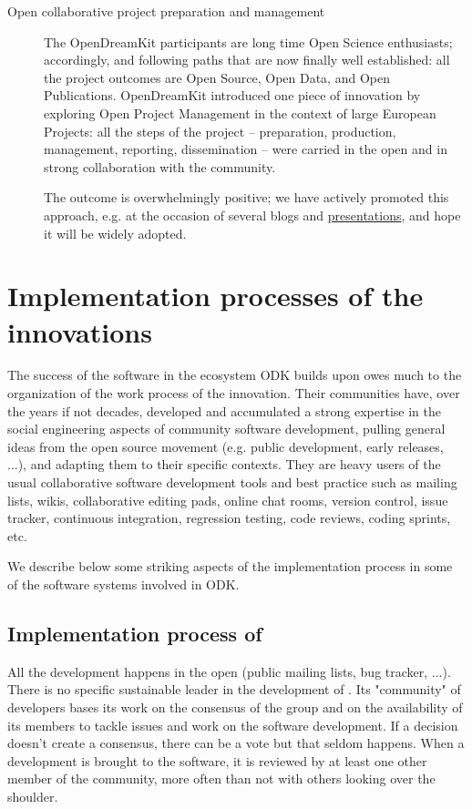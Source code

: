 \documentclass{deliverablereport}
\begin{document}
\begin{description}
\item[Open collaborative project preparation and management] The
  OpenDreamKit participants are long time Open Science enthusiasts;
  accordingly, and following paths that are now finally well
  established: all the project outcomes are Open Source, Open Data,
  and Open Publications. OpenDreamKit introduced one piece of
  innovation by exploring Open Project Management in the context of
  large European Projects: all the steps of the project --
  preparation, production, management, reporting, dissemination --
  were carried in the open and in strong collaboration with the
  community.

  The outcome is overwhelmingly positive; we have actively promoted
  this approach, e.g. at the occasion of several blogs and
  \href{https://opendreamkit.org/2018/12/14/eu-proposal/}{presentations},
  and hope it will be widely adopted.
\end{description}


\section{Implementation processes of the innovations}

The success of the software in the ecosystem ODK builds upon owes much
to the organization of the work process of the innovation. Their
communities have, over the years if not decades, developed and
accumulated a strong expertise in the social engineering aspects of
community software development, pulling general ideas from the open
source movement (e.g. public development, early releases, ...), and
adapting them to their specific contexts. They are heavy users of the
usual collaborative software development tools and best practice such
as mailing lists, wikis, collaborative editing pads, online chat
rooms, version control, issue tracker, continuous integration,
regression testing, code reviews, coding sprints, etc.

We describe below some striking aspects of the implementation process
in some of the software systems involved in ODK.

\subsection{Implementation process of \Sage}

All the development happens in the open (public mailing lists, bug
tracker, ...). There is no specific sustainable leader in the
development of \Sage. Its "community" of developers bases its work on
the consensus of the group and on the availability of its members to
tackle issues and work on the software development. If a decision
doesn't create a consensus, there can be a vote but that seldom
happens. When a development is brought to the software, it is reviewed
by at least one other member of the community, more often than not
with others looking over the shoulder.
\end{document}
